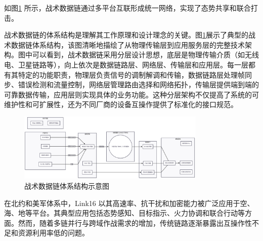 \begin{table}[!htb]
    \caption{典型战术数据链对比}
    \label{table_tdl_compare}
    \centering
\end{table}

如图\ref{fig_tdl_architecture} 所示，战术数据链通过多平台互联形成统一网络，实现了态势共享和联合打击。

战术数据链的体系结构是理解其工作原理和设计理念的关键。图\ref{fig_tdl_architecture}展示了典型的战术数据链体系结构，该图清晰地描绘了从物理传输层到应用服务层的完整技术架构。图中可以看到，战术数据链采用分层设计思想，底层是物理传输介质（如无线电、卫星链路等），向上依次是数据链路层、网络层、传输层和应用层。每一层都有其特定的功能职责，物理层负责信号的调制解调和传输，数据链路层处理帧同步、错误检测和流量控制，网络层管理路由选择和网络拓扑，传输层提供端到端的可靠数据传输，应用层则实现具体的业务功能。这种分层架构不仅提高了系统的可维护性和可扩展性，还为不同厂商的设备互操作提供了标准化的接口规范。

\begin{figure}[!htb]
    \centering
    \includegraphics[width=0.8\textwidth,height=0.33\textheight,keepaspectratio]{chapters/fig-0/tdl-architecture.png}
    \caption{战术数据链体系结构示意图}
    \label{fig_tdl_architecture}
\end{figure}

在北约和美军体系中，{Link16} 以其高速率、抗干扰和加密能力被广泛应用于空、海、地等平台\cite{Ultra_ADSI_2023}。其典型应用包括态势感知、目标指示、火力协调和联合行动等方面。然而，随着多链并行与跨域作战需求的增加，传统链路逐渐暴露出互操作性不足和资源利用率低的问题。

